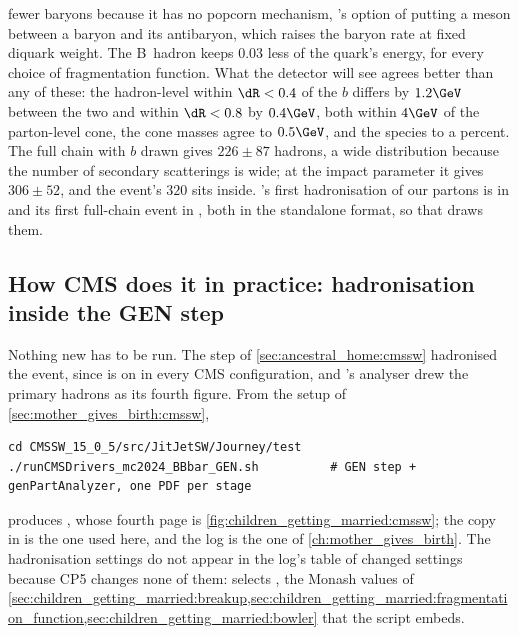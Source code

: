 fewer baryons because it has no popcorn mechanism, \PYTHIA's option of
putting a meson between a baryon and its antibaryon, which raises the
baryon rate at fixed diquark weight. The B~hadron keeps $0.03$ less of the
quark's energy, for every choice of fragmentation function. What the
detector will see agrees better than any of these: the hadron-level \pt
within $\dR<0.4$ of the $b$ differs by $1.2\GeV$ between the two and
within $\dR<0.8$ by $0.4\GeV$, both within $4\GeV$ of the parton-level
cone, the cone masses agree to $0.5\GeV$, and the species to a percent. The
full chain with $b$ drawn gives $226\pm87$ hadrons, a wide distribution
because the number of secondary scatterings is wide; at the \CMSSW impact
parameter it gives $306\pm52$, and the \CMSSW event's $320$ sits inside.
\PYTHIA's first hadronisation of our partons is in
 and its first
full-chain event in ,
both in the standalone format, so that  draws
them.

\subsection{How CMS does it in practice: hadronisation inside the GEN step}
\label{sec:children_getting_married:cmssw}

Nothing new has to be run. The  step of
\cref{sec:ancestral_home:cmssw} hadronised the event, since
 is on in every CMS configuration, and
's analyser drew the primary hadrons as its fourth figure.
From the setup of \cref{sec:mother_gives_birth:cmssw},
\begin{verbatim}
cd CMSSW_15_0_5/src/JitJetSW/Journey/test
./runCMSDrivers_mc2024_BBbar_GEN.sh          # GEN step + genPartAnalyzer, one PDF per stage
\end{verbatim}
produces , whose fourth page is
\cref{fig:children_getting_married:cmssw}; the copy in
 is the one used here, and the log is the one of
\cref{ch:mother_gives_birth}. The hadronisation settings do not appear in
the log's table of changed settings because CP5 changes none of them:
 selects , the Monash values of
\cref{sec:children_getting_married:breakup,sec:children_getting_married:fragmentation_function,sec:children_getting_married:bowler}
that the script embeds.

